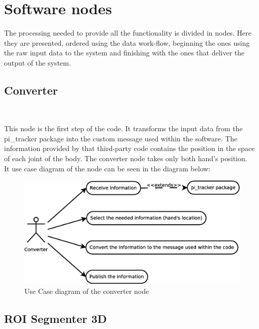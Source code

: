\section{Software nodes}
\label{software_nodes}


The processing needed to provide all the functionality is divided in nodes. Here they are presented, ordered using the data work-flow, beginning the ones using the raw input data to the system and finishing with the ones that deliver the output of the system. 
\\


\subsection{\large Converter}\\
		\label{converter}

	This node is the first step of the code. It transforms the input data from the pi\_tracker package into the custom message used within the software. The information provided by that third-party code contains the position in the space of each joint of the body. The converter node takes only both hand's position. 
	\\

	It use case diagram of the node can be seen in the diagram below: 

	\begin{figure}[h]
		\begin{center}
	\includegraphics[scale=0.2]{img/diagrams/uc_converter.eps}
		\caption[Use case diagram converter node]{Use Case diagram of the converter node}
		\end{center}
	\end{figure}

	
\subsection{ROI Segmenter 3D}\\
	\label{roi_segmenter_3d}

